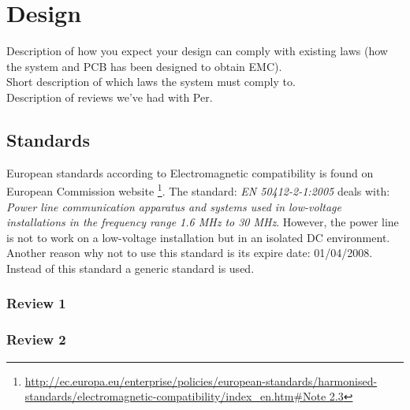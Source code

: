 \chapter{Design}
Description of how you expect your design can comply with existing laws (how the system and PCB has been designed to obtain EMC).
\\ Short description of which laws the system must comply to.
\\ Description of reviews we've had with Per.
\section{Standards}
European standards according to Electromagnetic compatibility is found on European Commission website \footnote{\url{http://ec.europa.eu/enterprise/policies/european-standards/harmonised-standards/electromagnetic-compatibility/index\_en.htm\#Note 2.3}}.
The standard: \textit{EN 50412-2-1:2005} deals with: \textit{Power line communication apparatus and systems used in low-voltage installations in the frequency range 1.6 MHz to 30 MHz}. However, the power line is not to work on a low-voltage installation but in an isolated DC environment. Another reason why not to use this standard is its expire date: 01/04/2008. Instead of this standard a generic standard is used.


\subsection{Review 1}
\subsection{Review 2}